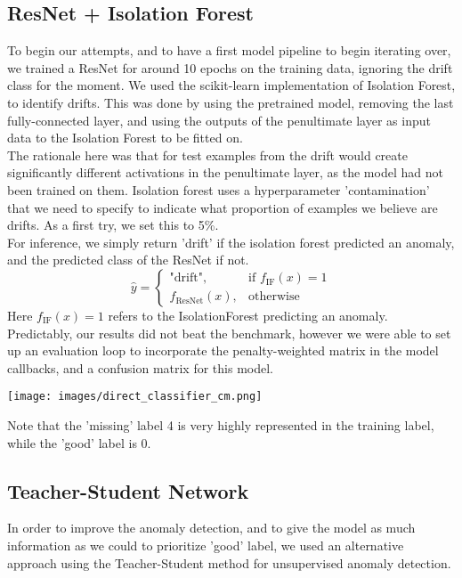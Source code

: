 \documentclass[a4paper]{article}
\begin{document}
    \subsection{ResNet + Isolation Forest}
    To begin our attempts, and to have a first model pipeline to begin iterating over, we trained a ResNet for around 10 epochs on the training data, ignoring the drift class for the moment. We used the scikit-learn implementation of Isolation Forest, to identify drifts. This was done by using the pretrained model, removing the last fully-connected layer, and using the outputs of the penultimate layer as input data to the Isolation Forest to be fitted on. \\
    The rationale here was that for test examples from the drift would create significantly different activations in the penultimate layer, as the model had not been trained on them. Isolation forest uses a hyperparameter 'contamination' that we need to specify to indicate what proportion of examples we believe are drifts. As a first try, we set this to 5\%. \\
    For inference, we simply return 'drift' if the isolation forest predicted an anomaly, and the predicted class of the ResNet if not. 
    \[
\hat{y} =
\begin{cases} 
\text{"drift"}, & \text{if } f_{\text{IF}}(x) = 1 \\
f_{\text{ResNet}}(x), & \text{otherwise}
\end{cases}
\]
Here $f_{\text{IF}}(x) = 1$ refers to the IsolationForest predicting an anomaly.\\
    Predictably, our results did not beat the benchmark, however we were able to set up an evaluation loop to incorporate the penalty-weighted matrix in the model callbacks, and a confusion matrix for this model. 
    \begin{center}
        \texttt{[image: images/direct\_classifier\_cm.png]}    
    \end{center}
    Note that the 'missing' label 4 is very highly represented in the training label, while the 'good' label is 0. 
    \subsection{Teacher-Student Network}
    In order to improve the anomaly detection, and to give the model as much information as we could to prioritize 'good' label, we used an alternative approach using the Teacher-Student method for unsupervised anomaly detection.
\begin{thebibliography}{}
\end{thebibliography}
	
\end{document}
